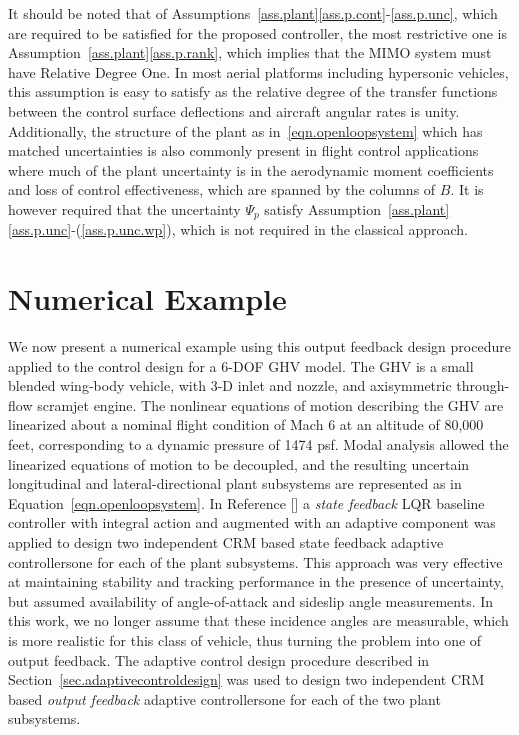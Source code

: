 \documentclass[]{../sty/aiaa-tc}
\begin{document}
  It should be noted that of Assumptions~\ref{ass.plant}\ref{ass.p.cont}-\ref{ass.p.unc}, which are required to be satisfied for the proposed controller, the most restrictive one is Assumption~\ref{ass.plant}\ref{ass.p.rank}, which implies that the MIMO system must have Relative Degree One.
  In most aerial platforms including hypersonic vehicles, this assumption is easy to satisfy as the relative degree of the transfer functions between the control surface deflections and aircraft angular rates is unity.
  Additionally, the structure of the plant as in\ \eqref{eqn.openloopsystem} which has matched uncertainties is also commonly present in flight control applications where much of the plant uncertainty is in the aerodynamic moment coefficients and loss of control effectiveness, which are spanned by the columns of $B$.
  It is however required that the uncertainty $\Psi_{p}$ satisfy Assumption~\ref{ass.plant}\ref{ass.p.unc}-(\ref{ass.p.unc.wp}), which is not required in the classical approach.

  \section{Numerical Example}\label{sec.example}

  We now present a numerical example using this output feedback design procedure applied to the control design for a 6-DOF GHV model\cite{wiese.adaptive.2013,rollins.nonlinear.2013}.
  The GHV is a small blended wing-body vehicle, with 3-D inlet and nozzle, and axisymmetric through-flow scramjet engine.
  The nonlinear equations of motion describing the GHV are linearized about a nominal flight condition of Mach 6 at an altitude of 80,000 feet, corresponding to a dynamic pressure of 1474 psf.
  Modal analysis allowed the linearized equations of motion to be decoupled, and the resulting uncertain longitudinal and lateral-directional plant subsystems are represented as in Equation\ \eqref{eqn.openloopsystem}.
  In Reference [] a \textit{state feedback} LQR baseline controller with integral action and augmented with an adaptive component was applied to design two independent CRM based state feedback adaptive controllers\textemdash{}one for each of the plant subsystems.
  This approach was very effective at maintaining stability and tracking performance in the presence of uncertainty, but assumed availability of angle-of-attack and sideslip angle measurements.
  In this work, we no longer assume that these incidence angles are measurable, which is more realistic for this class of vehicle, thus turning the problem into one of output feedback.
  The adaptive control design procedure described in Section~\ref{sec.adaptivecontroldesign} was used to design two independent CRM based \textit{output feedback} adaptive controllers\textemdash{}one for each of the two plant subsystems.
\end{document}
